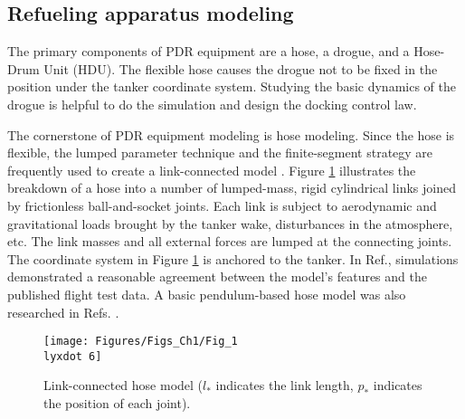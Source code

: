 \subsection{Refueling apparatus modeling}

The primary components of PDR equipment are a hose, a drogue, and
a Hose-Drum Unit (HDU). The flexible hose causes the drogue not to
be fixed in the position under the tanker coordinate system. Studying
the basic dynamics of the drogue is helpful to do the simulation and
design the docking control law.

The cornerstone of PDR equipment modeling is hose modeling. Since
the hose is flexible, the lumped parameter technique and the finite-segment
strategy are frequently used to create a link-connected model\cite{bloy2002modelling}
\cite{zibo2012research}. Figure \ref{Fig_1.6} illustrates the breakdown
of a hose into a number of lumped-mass, rigid cylindrical links joined
by frictionless ball-and-socket joints. Each link is subject to aerodynamic
and gravitational loads brought by the tanker wake, disturbances in
the atmosphere, etc. The link masses and all external forces are lumped
at the connecting joints. The coordinate system in Figure \ref{Fig_1.6}
is anchored to the tanker. In Ref.\cite{hose-link-model}, simulations
demonstrated a reasonable agreement between the model's features and
the published flight test data. A basic pendulum-based hose model
was also researched in Refs. \cite{pud-drogue,dai2018iterative}.

\begin{figure}
\begin{centering}
\texttt{[image: Figures/Figs\_Ch1/Fig\_1\\lyxdot 6]}
\par\end{centering}
\caption{Link-connected hose model ($l_{*}$ indicates the link length, $p_{*}$
indicates the position of each joint).}

\centering{}\label{Fig_1.6}
\end{figure}

